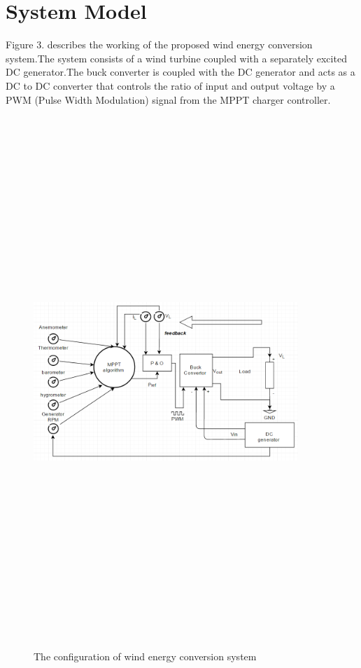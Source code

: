 \section{System Model}
\label{sec:1}
Figure 3. describes the working of the  proposed wind energy conversion system.The system consists of a wind turbine coupled with a separately excited  DC generator.The buck converter is coupled with the DC generator and acts as a DC to DC converter that controls the ratio of input and output voltage by a PWM (Pulse Width Modulation) signal from the MPPT charger controller.
\begin{center}
\begin{figure}
\includegraphics[width=10cm,height=20cm,keepaspectratio]{3.png}
\caption{The configuration of wind energy conversion system}
\label{Fig:3}    
\end{figure}
\end{center}
